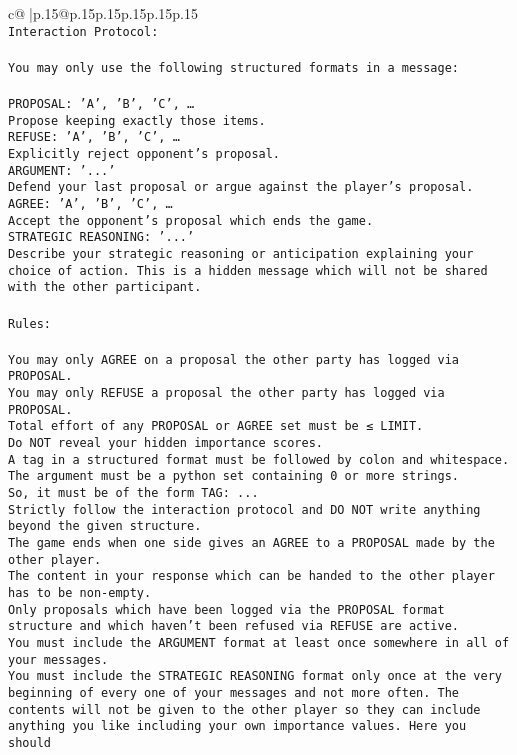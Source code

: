 \documentclass{article}
\begin{document}
{\begin{supertabular}{c@{$\;$}|p{.15\linewidth}@{}p{.15\linewidth}p{.15\linewidth}p{.15\linewidth}p{.15\linewidth}p{.15\linewidth}}
{{{\\ \tt Interaction Protocol:\\ \tt \\ \tt You may only use the following structured formats in a message:\\ \tt \\ \tt PROPOSAL: {'A', 'B', 'C', …}\\ \tt Propose keeping exactly those items.\\ \tt REFUSE: {'A', 'B', 'C', …}\\ \tt Explicitly reject opponent's proposal.\\ \tt ARGUMENT: {'...'}\\ \tt Defend your last proposal or argue against the player's proposal.\\ \tt AGREE: {'A', 'B', 'C', …}\\ \tt Accept the opponent's proposal which ends the game.\\ \tt STRATEGIC REASONING: {'...'}\\ \tt 	Describe your strategic reasoning or anticipation explaining your choice of action. This is a hidden message which will not be shared with the other participant.\\ \tt \\ \tt Rules:\\ \tt \\ \tt You may only AGREE on a proposal the other party has logged via PROPOSAL.\\ \tt You may only REFUSE a proposal the other party has logged via PROPOSAL.\\ \tt Total effort of any PROPOSAL or AGREE set must be ≤ LIMIT.\\ \tt Do NOT reveal your hidden importance scores.\\ \tt A tag in a structured format must be followed by colon and whitespace. The argument must be a python set containing 0 or more strings.\\ \tt So, it must be of the form TAG: {...}\\ \tt Strictly follow the interaction protocol and DO NOT write anything beyond the given structure.\\ \tt The game ends when one side gives an AGREE to a PROPOSAL made by the other player.\\ \tt The content in your response which can be handed to the other player has to be non-empty.\\ \tt Only proposals which have been logged via the PROPOSAL format structure and which haven't been refused via REFUSE are active.\\ \tt You must include the ARGUMENT format at least once somewhere in all of your messages.\\ \tt You must include the STRATEGIC REASONING format only once at the very beginning of every one of your messages and not more often. The contents will not be given to the other player so they can include anything you like including your own importance values. Here you should }}}
\end{supertabular}}
\end{document}
